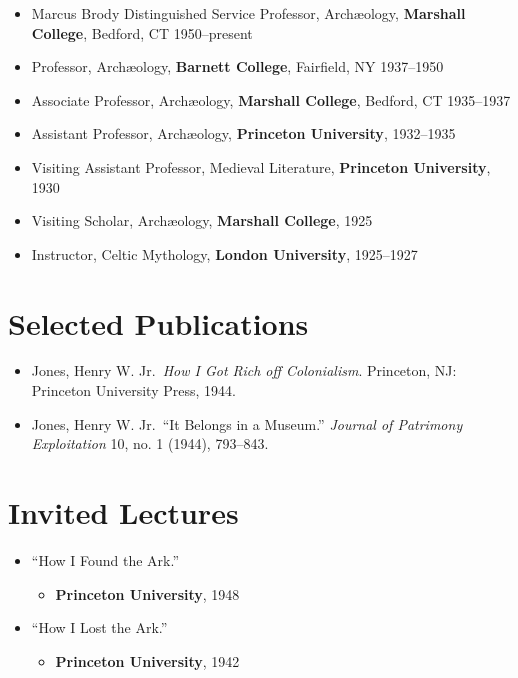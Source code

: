 \documentclass[%
    11pt,
  oneside
  ]{memoir}
\let\oldsection\section
\renewcommand{\section}[1]{%
  \oldsection{#1}
  \leavevmode
  \par
  \vspace{\dimexpr-\baselineskip-\parskip}
}
\begin{document}
\begin{itemize}
\tightlist
\item
  Marcus Brody Distinguished Service Professor, Archæology,
  \textbf{Marshall College}, Bedford, CT 1950--present
\item
  Professor, Archæology, \textbf{Barnett College}, Fairfield, NY
  1937--1950
\item
  Associate Professor, Archæology, \textbf{Marshall College}, Bedford,
  CT 1935--1937
\item
  Assistant Professor, Archæology, \textbf{Princeton University},
  1932--1935
\item
  Visiting Assistant Professor, Medieval Literature, \textbf{Princeton
  University}, 1930
\item
  Visiting Scholar, Archæology, \textbf{Marshall College}, 1925
\item
  Instructor, Celtic Mythology, \textbf{London University}, 1925--1927
\end{itemize}

\hypertarget{selected-publications}{%
\section{Selected Publications}\label{selected-publications}}

\begin{itemize}
\tightlist
\item
  Jones, Henry W. Jr.~\emph{How I Got Rich off Colonialism}. Princeton,
  NJ: Princeton University Press, 1944.
\item
  Jones, Henry W. Jr.~``It Belongs in a Museum.'' \emph{Journal of
  Patrimony Exploitation} 10, no. 1 (1944), 793--843.
\end{itemize}

\hypertarget{invited-lectures}{%
\section{Invited Lectures}\label{invited-lectures}}

\begin{itemize}
\tightlist
\item
  ``How I Found the Ark.''

  \begin{itemize}
  \tightlist
  \item
    \textbf{Princeton University}, 1948
  \end{itemize}
\item
  ``How I Lost the Ark.''

  \begin{itemize}
  \tightlist
  \item
    \textbf{Princeton University}, 1942
  \end{itemize}
\end{itemize}
\end{document}
